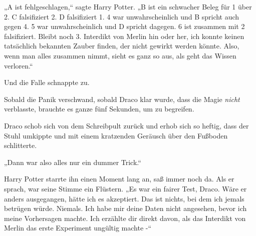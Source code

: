 „A ist fehlgeschlagen,“ sagte Harry Potter. „B ist ein schwacher Beleg für 1 über 2. C falsifiziert 2. D falsifiziert 1. 4 war unwahrscheinlich und B spricht auch gegen 4. 5 war unwahrscheinlich und D spricht dagegen. 6 ist zusammen mit 2 falsifiziert. Bleibt noch 3. Interdikt von Merlin hin oder her, ich konnte keinen tatsächlich bekannten Zauber finden, der nicht gewirkt werden könnte. Also, wenn man alles zusammen nimmt, sieht es ganz so aus, als geht das Wissen verloren.“

Und die Falle schnappte zu.

Sobald die Panik verschwand, sobald Draco klar wurde, dass die Magie \emph{nicht} verblasste, brauchte es ganze fünf Sekunden, um zu begreifen.

Draco schob sich von dem Schreibpult zurück und erhob sich so heftig, dass der Stuhl umkippte und mit einem kratzenden Geräusch über den Fußboden schlitterte.

„Dann war also alles nur ein dummer Trick.“

Harry Potter starrte ihn einen Moment lang an, saß immer noch da. Als er sprach, war seine Stimme ein Flüstern. „Es war ein fairer Test, Draco. Wäre er anders ausgegangen, hätte ich es akzeptiert. Das ist nichts, bei dem ich jemals betrügen würde. Niemals. Ich habe mir deine Daten nicht angesehen, bevor ich meine Vorhersagen machte. Ich erzählte dir direkt davon, als das Interdikt von Merlin das erste Experiment ungültig machte -“


